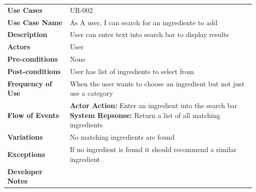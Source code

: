 \documentclass[12pt]{article}
\begin{document}
  \begin{tabular}{ l | l }
    \hline
    \textbf{Use Cases} & UR-002 \\ \rowcolor[gray]{.95}
    \textbf{Use Case Name} & As A user, I can search for an ingrediente to add  \\ 
    \textbf{Description} & User can enter text into search bar to display results \\ \rowcolor[gray]{.95}
    \textbf{Actors} & User \\
    \textbf{Pre-conditions} & None \\ \rowcolor[gray]{.95}
    \textbf{Post-conditions} & User has list of ingredients to select from \\ 
    \textbf{Frequency of Use} & When the user wants to choose an ingredient but not just use a category \\ \rowcolor[gray]{.95}
    \textbf{Flow of Events} & \pbox{20cm}{\textbf{Actor Action: }Enter an ingredient into the search bar \\
    \textbf{System Repsonse:} Return a list of all matching ingredients }  \\
    \textbf{Variations} & No matching ingredients are found \\  \rowcolor[gray]{.95}
    \textbf{Exceptions} & If no ingredient is found it should recommend a similar ingredient \\
    \textbf{Developer Notes} &  \\ \hline
  \end{tabular}
 
\end{document}
